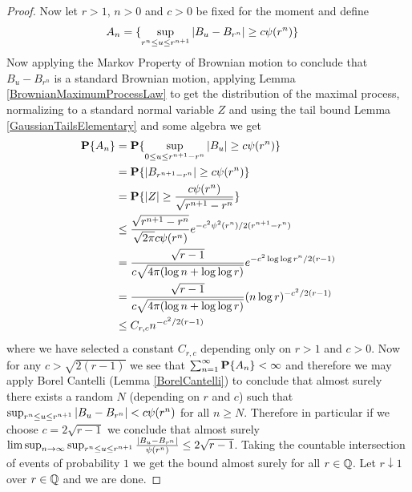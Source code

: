 \begin{proof}
Now let $r > 1$, $n > 0$ and $c > 0$ be fixed for the moment and define
\begin{align*}
A_n &= \lbrace \sup_{r^n \leq u \leq r^{n+1}} \left \vert B_u - B_{r^n} \right \vert \geq
  c \psi(r^n) \rbrace
\end{align*}
Now applying the Markov Property of Brownian motion to conclude that $B_u
- B_{r^n}$ is a standard Brownian motion,   applying Lemma
\ref{BrownianMaximumProcessLaw} to get the distribution of the maximal
process, normalizing to a standard normal variable $Z$ and using the
tail bound Lemma \ref{GaussianTailsElementary} and some algebra we get
\begin{align*}
\textbf{P}\{A_n\} 
&= \textbf{P}\{\sup_{0\leq u \leq r^{n+1} - r^n}
    \left \vert B_{u} \right \vert \geq  c \psi(r^n)\} \\
&= \textbf{P}\{\left \vert B_{r^{n+1} - r^n} \right \vert \geq  c \psi(r^n)\} \\
&= \textbf{P}\{\left \vert Z \right \vert \geq  \frac{c
    \psi(r^n)}{\sqrt{r^{n+1} - r^n}}\} \\
&\leq \frac{\sqrt{r^{n+1} - r^n}}{\sqrt{2 \pi} c\psi(r^n)} e^{-c^2
  \psi^2(r^n)/2(r^{n+1} -r^n)} \\
&= \frac{\sqrt{r - 1}}{c \sqrt{4 \pi (\log n + \log \log r) } } e^{-c^2
  \log \log r^n/2(r -1)} \\
&= \frac{\sqrt{r - 1}}{c \sqrt{4 \pi (\log n + \log \log r) } } (n
\log r)^{-c^2/2(r -1)} \\
&\leq C_{r,c} n^{-c^2/2(r -1)}
\end{align*}
where we have selected a constant $C_{r,c}$ depending only on $r>1$
and $c > 0$.  Now for any $c > \sqrt{2(r-1)}$ we see that
$\sum_{n=1}^\infty \textbf{P}\{A_n\} < \infty$ and therefore we may
apply Borel Cantelli (Lemma \ref{BorelCantelli}) to conclude that
almost surely there exists a random $N$ (depending on $r$ and $c$) such that $\sup_{r^n \leq u \leq r^{n+1}} \left \vert B_u - B_{r^n} \right \vert <
  c \psi(r^n)$ for all $n \geq N$.  Therefore in particular if we
  choose $c = 2\sqrt{r-1}$ we conclude that
  almost surely
  $\limsup_{n \to \infty} \sup_{r^n \leq u \leq r^{n+1}}
  \frac{\left \vert B_u - B_{r^n} \right \vert }{\psi(r^n)} \leq 2\sqrt{r-1}$.  Taking
  the countable intersection of events of probability $1$  we get the
  bound almost surely for all $r \in
  \mathbb{Q}$.  Let $r \downarrow 1$ over $r \in \mathbb{Q}$ and we are done.
\end{proof}

